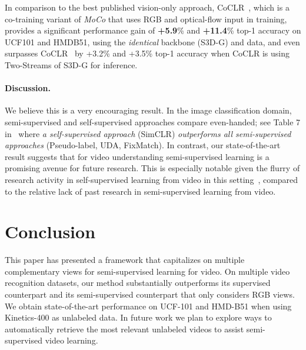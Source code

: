 \documentclass[10pt,twocolumn,letterpaper]{article}
\begin{document}
In comparison to the best published vision-only approach, CoCLR~\cite{Han20}, which is a co-training variant of \textit{MoCo} \cite{he2020momentum} that uses RGB and optical-flow input in training,  \textbf{\oursshort} provides a significant performance gain of \textbf{+5.9}\% and \textbf{+11.4}\% top-1 accuracy on UCF101 and HMDB51, using the \textit{identical} backbone (S3D-G) and data, and even surpasses  \mbox{CoCLR}~\cite{Han20} by {+3.2}\% and {+3.5}\% top-1 accuracy when CoCLR is using Two-Streams of S3D-G for inference. 


\paragraph{Discussion.}
We believe this is a very encouraging result. 
{In} the image classification domain, semi-supervised and self-supervised approaches compare even-handed; \eg see Table 7 in~\cite{Chen20} where \textit{a self-supervised approach} (SimCLR) \textit{outperforms all semi-supervised approaches} (\eg Pseudo-label, UDA, FixMatch).  {In contrast,} our state-of-the-art result suggests that for video understanding semi-supervised learning is a promising avenue for future research. {This is especially notable} 
given the flurry of research activity in self-supervised learning from video in this setting~\cite{alwassel2019self,avid,patrick2020multi,benaim2020speednet,Han20,yang2020video}, compared to the relative lack of past research in semi-supervised learning from video.  




\section{Conclusion}\label{sec:conclusions}


This paper has presented a \ours framework that capitalizes on multiple complementary views for semi-supervised learning {for video}.
On multiple video recognition datasets, our method substantially outperforms its supervised counterpart and its semi-supervised counterpart that only considers RGB views.  
We obtain state-of-the-art performance on UCF-101 and HMD-B51 when using Kinetics-400 as unlabeled data.
In future work we plan to explore ways to automatically retrieve the most relevant unlabeled videos to assist semi-supervised video learning. %


\newcount\cvprrulercount
\appendix

\setcounter{table}{0}
\renewcommand{\thetable}{A.\arabic{table}}	
\end{document}

